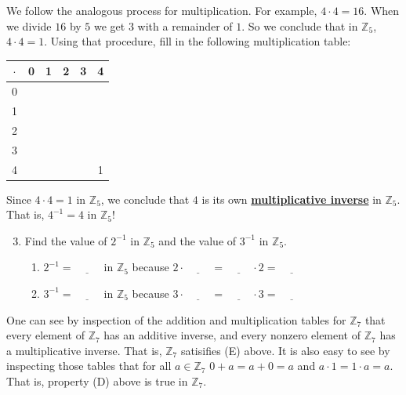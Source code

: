 \documentclass[11pt]{article}
\renewcommand\emph[1]{\underline{\bf{#1}}} %
\theoremstyle{definition}
\begin{document}
  We follow the analogous process for multiplication. For example, $4 \cdot 4 = 16$. When we divide $16$ by $5$ we get $3$ with a remainder of $1$. So we
  conclude that in $\mathbb{Z}_5$, $4 \cdot 4 = 1$. Using that procedure, fill in the following multiplication table:

  \begin{center}
    \begin{tabular}{|c|c|c|c|c|c|}\\ \hline
      $\cdot$ & 0 & 1 & 2 & 3 & 4 \\ \hline
      0   &   &   &   &   &   \\ \hline
      1   &   &   &   &   &   \\ \hline
      2   &   &   &   &   &   \\ \hline
      3   &   &   &   &   &   \\ \hline
      4   &   &   &   &   & 1 \\ \hline
    \end{tabular}
  \end{center}

  Since $4\cdot 4 = 1$ in $\mathbb{Z}_5$, we conclude that $4$ is its own \emph{multiplicative inverse} in $\mathbb{Z}_5$. That is, $4^{-1}=4$ in $\mathbb{Z}_5$!

    \begin{enumerate}
        \setcounter{enumi}{2}
      \item Find the value of $2^{-1}$ in $\mathbb{Z}_5$ and the value of $3^{-1}$ in $\mathbb{Z}_5$. 
        \begin{enumerate}
          \item $2^{-1}=\underline{\hspace{1cm}}$ in $\mathbb{Z}_5$ because $2\cdot \underline{\hspace{1cm}} = \underline{\hspace{1cm}}\cdot 2 = \underline{\hspace{1cm}}$
          \item $3^{-1}=\underline{\hspace{1cm}}$ in $\mathbb{Z}_5$ because $3\cdot \underline{\hspace{1cm}} = \underline{\hspace{1cm}}\cdot 3 = \underline{\hspace{1cm}}$
        \end{enumerate}
    \end{enumerate}

    One can see by inspection of the addition and multiplication tables for $\mathbb{Z}_7$ that every element of $\mathbb{Z}_7$ has an additive inverse, and
    every nonzero element of $\mathbb{Z}_7$ has a multiplicative inverse. That is, $\mathbb{Z}_7$ satisifies (E) above. It is also easy to see by 
    inspecting those tables that for all $a\in \mathbb{Z}_7$ $0+a=a+0 = a$ and $a\cdot 1 = 1 \cdot a = a$. That is, property (D) above is true 
    in $\mathbb{Z}_7$. 
\end{document}
